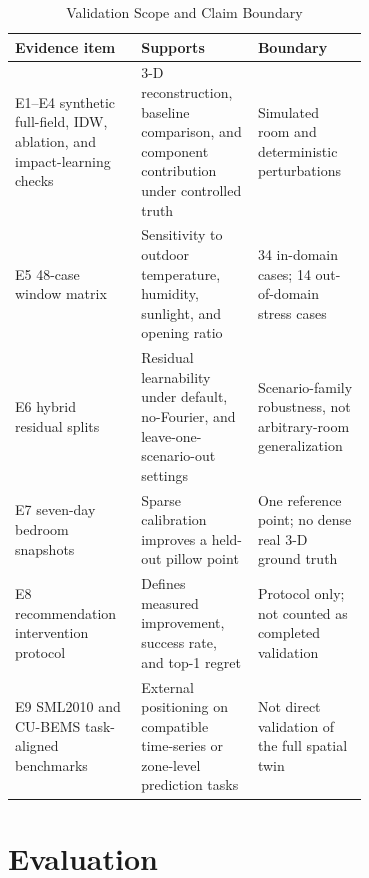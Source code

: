 \documentclass[conference,a4paper]{IEEEtran}
\begin{document}
\begin{table}[t]
\caption{Validation Scope and Claim Boundary}
\label{tab:claim_scope}
\centering
\scriptsize
\begin{tabular}{|P{0.23\linewidth}|P{0.24\linewidth}|P{0.23\linewidth}|}
\hline
Evidence item & Supports & Boundary\\
\hline
E1--E4 synthetic full-field, IDW, ablation, and impact-learning checks & 3-D reconstruction, baseline comparison, and component contribution under controlled truth & Simulated room and deterministic perturbations\\
\hline
E5 48-case window matrix & Sensitivity to outdoor temperature, humidity, sunlight, and opening ratio & 34 in-domain cases; 14 out-of-domain stress cases\\
\hline
E6 hybrid residual splits & Residual learnability under default, no-Fourier, and leave-one-scenario-out settings & Scenario-family robustness, not arbitrary-room generalization\\
\hline
E7 seven-day bedroom snapshots & Sparse calibration improves a held-out pillow point & One reference point; no dense real 3-D ground truth\\
\hline
E8 recommendation intervention protocol & Defines measured improvement, success rate, and top-1 regret & Protocol only; not counted as completed validation\\
\hline
E9 SML2010 and CU-BEMS task-aligned benchmarks & External positioning on compatible time-series or zone-level prediction tasks & Not direct validation of the full spatial twin\\
\hline
\end{tabular}
\end{table}

\section{Evaluation}
\end{document}
